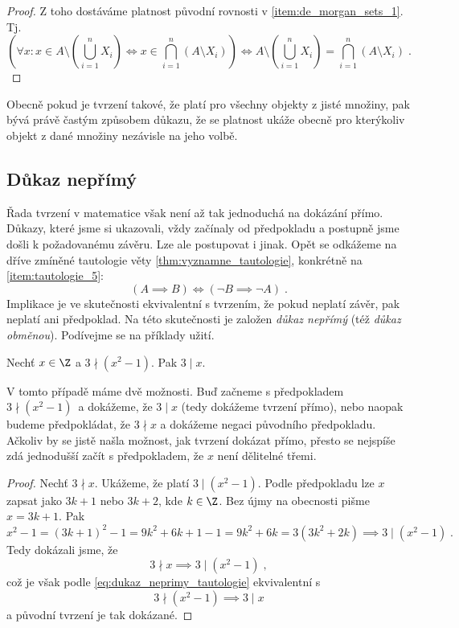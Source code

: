 \begin{proof}
    Z toho dostáváme platnost původní rovnosti v \ref{item:de_morgan_sets_1}. Tj.
    \begin{equation*}
        \left(\forall x : x \in A \setminus \left(\bigcup\limits_{i=1}^{n}{X_i}\right) \iff x\in\bigcap\limits_{i=1}^{n}{(A \setminus X_i)}\right) \iff A \setminus \left(\bigcup\limits_{i=1}^{n}{X_i}\right)=\bigcap\limits_{i=1}^{n}{(A \setminus X_i)}\; .
    \end{equation*}
\end{proof}
Obecně pokud je tvrzení takové, že platí pro všechny objekty z jisté množiny, pak bývá právě častým způsobem důkazu, že se platnost ukáže obecně pro kterýkoliv objekt z dané množiny nezávisle na jeho volbě.

\subsection{Důkaz nepřímý}\label{subsec:dukaz_neprimy}
Řada tvrzení v matematice však není až tak jednoduchá na dokázání přímo. Důkazy, které jsme si ukazovali, vždy začínaly od předpokladu a postupně jsme došli k požadovanému závěru. Lze ale postupovat i jinak. Opět se odkážeme na dříve zmíněné tautologie věty \ref{thm:vyznamne_tautologie}, konkrétně na \ref{item:tautologie_5}:
\begin{equation}\label{eq:dukaz_neprimy_tautologie}
    (A \implies B) \iff (\neg B \implies \neg A)\; .
\end{equation}
Implikace je ve skutečnosti ekvivalentní s tvrzením, že pokud neplatí závěr, pak neplatí ani předpoklad. Na této skutečnosti je založen \emph{důkaz nepřímý} (též \emph{důkaz obměnou}). Podívejme se na příklady užití.
\begin{assertion}
    Nechť $x\in\Z$ a $3 \nmid (x^2-1)$. Pak $3 \mid x$.
\end{assertion}
V tomto případě máme dvě možnosti. Buď začneme s předpokladem $3 \nmid (x^2-1)$~a dokážeme, že $3 \mid x$ (tedy dokážeme tvrzení přímo), nebo naopak budeme předpokládat, že $3 \nmid x$ a dokážeme negaci původního předpokladu. Ačkoliv by se jistě našla možnost, jak tvrzení dokázat přímo, přesto se nejspíše zdá jednodušší začít s předpokladem, že $x$ není dělitelné třemi.
\begin{proof}
    Nechť $3 \nmid x$. Ukážeme, že platí $3 \mid (x^2-1)$. Podle předpokladu lze $x$ zapsat jako $3k+1$ nebo $3k+2$, kde $k\in\Z$. Bez újmy na obecnosti pišme $x=3k+1$. Pak
    \begin{equation*}
        x^2-1=(3k+1)^2-1=9k^2+6k+1-1=9k^2+6k=3(3k^2+2k)\implies 3 \mid (x^2-1)\; .
    \end{equation*}
    Tedy dokázali jsme, že
    \begin{equation*}
        3 \nmid x \implies 3 \mid (x^2-1)\; ,
    \end{equation*}
    což je však podle \ref{eq:dukaz_neprimy_tautologie} ekvivalentní s
    \begin{equation*}
        3 \nmid (x^2-1) \implies 3 \mid x
    \end{equation*}
    a původní tvrzení je tak dokázané.
\end{proof}

